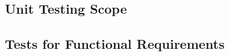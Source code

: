 \documentclass[12pt, titlepage]{article}
\providecommand{\wss}[1]{}
\begin{document}
\subsection{Unit Testing Scope}

\wss{What modules are outside of the scope.  If there are modules that are
  developed by someone else, then you would say here if you aren't planning on
  verifying them.  There may also be modules that are part of your software, but
  have a lower priority for verification than others.  If this is the case,
  explain your rationale for the ranking of module importance.}

\subsection{Tests for Functional Requirements}






					
					
					


					
\end{document}
